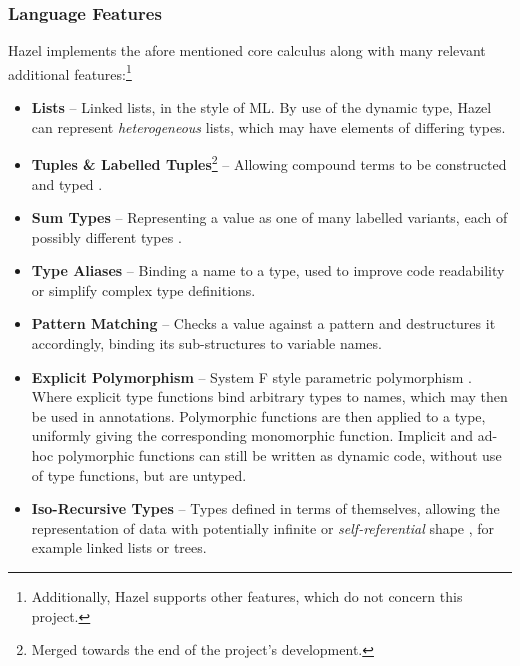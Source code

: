\subsubsection{Language Features}\label{sec:HazelAdditionalFeatures}
Hazel implements the afore mentioned core calculus along with many relevant additional features:\footnote{Additionally, Hazel supports other features, which do not concern this project.}
\begin{itemize}
\item \textbf{Lists} -- Linked lists, in the style of ML. By use of the dynamic type, Hazel can represent \textit{heterogeneous} lists, which may have elements of differing types.  
\item \textbf{Tuples \& Labelled Tuples}\footnote{Merged towards the end of the project's development.} -- Allowing compound terms to be constructed and typed \cite[ch. 11.7-8]{TAPL}.
\item \textbf{Sum Types} -- Representing a value as one of many labelled variants, each of possibly different types \cite[ch. 11.10]{TAPL}.
\item \textbf{Type Aliases} -- Binding a name to a type, used to improve code readability or simplify complex type definitions.
\item \textbf{Pattern Matching} -- Checks a value against a pattern and destructures it accordingly, binding its sub-structures to variable names.
\item \textbf{Explicit Polymorphism} -- System F style parametric polymorphism \cite[ch. 23]{TAPL}. Where explicit type functions bind arbitrary types to names, which may then be used in annotations. Polymorphic functions are then applied to a type, uniformly giving the corresponding monomorphic function. Implicit and ad-hoc polymorphic functions can still be written as dynamic code, without use of type functions, but are untyped.
\item \textbf{Iso-Recursive Types} -- Types defined in terms of themselves, allowing the representation of data with potentially infinite or \textit{self-referential} shape \cite[ch. 22-23]{TAPL}, for example linked lists or trees.
\end{itemize}

